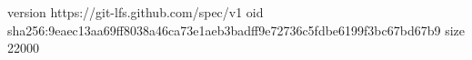 version https://git-lfs.github.com/spec/v1
oid sha256:9eaec13aa69ff8038a46ca73e1aeb3badff9e72736c5fdbe6199f3bc67bd67b9
size 22000
